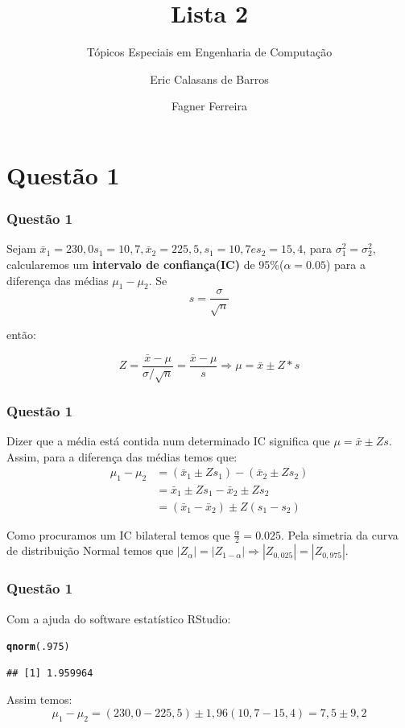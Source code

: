 \documentclass{beamer}\usepackage[]{graphicx}\usepackage[]{color}
\makeatletter
\newcommand{\hlnum}[1]{\textcolor[rgb]{0.686,0.059,0.569}{#1}}%
\newcommand{\hlstd}[1]{\textcolor[rgb]{0.345,0.345,0.345}{#1}}%
\newcommand{\hlkwd}[1]{\textcolor[rgb]{0.737,0.353,0.396}{\textbf{#1}}}%
\newenvironment{kframe}{%
 \def\at@end@of@kframe{}%
 \ifinner\ifhmode%
  \def\at@end@of@kframe{\end{minipage}}%
  \begin{minipage}{\columnwidth}%
 \fi\fi%
 \def\FrameCommand##1{\hskip\@totalleftmargin \hskip-\fboxsep
 \colorbox{shadecolor}{##1}\hskip-\fboxsep
     \hskip-\linewidth \hskip-\@totalleftmargin \hskip\columnwidth}%
 \MakeFramed {\advance\hsize-\width
   \@totalleftmargin\z@ \linewidth\hsize
   \@setminipage}}%
 {\par\unskip\endMakeFramed%
 \at@end@of@kframe}
\newenvironment{knitrout}{}{} %
\makeatother
\begin{document}
	\title{Lista 2}
	\subtitle{Tópicos Especiais em Engenharia de Computação}
	\author{Eric Calasans de Barros \and  Fagner Ferreira}
	
	\begin{frame}[plain]
		\maketitle
	\end{frame}
	
	\section{Questão 1}
		\begin{frame}
			\frametitle{Questão 1}
			Sejam $\bar{x}_{1} = 230,0 s_{1} = 10,7, \bar{x}_{2} = 225,5, s_{1} = 10,7 e s_{2} = 15,4$, para $\sigma_{1}^{2} = \sigma_{2}^{2}$, calcularemos um \textbf{intervalo de confiança(IC)} de 95\%($\alpha = 0.05$) para a diferença das médias $\mu_{1} - \mu_{2}$.  Se $$s = \frac{\sigma}{\sqrt{n}}$$
			
			então:
			
			$$Z = \frac{\bar{x} - \mu}{\sigma/\sqrt{n}} = \frac{\bar{x} - \mu}{s} \Rightarrow \mu = \bar{x} \pm Z*s$$
		\end{frame}
		\begin{frame}
			\frametitle{Questão 1}
			Dizer que a média está contida num determinado IC significa que $\mu = \bar{x} \pm Zs$.  Assim, para a diferença das médias temos que:
				\begin{align*}
					\mu_{1} - \mu_{2} &= (\bar{x}_{1} \pm Zs_{1}) - (\bar{x}_{2} \pm Zs_{2})\\
					&= \bar{x}_{1} \pm  Zs_{1} - \bar{x}_{2} \pm Zs_{2}\\
					&= (\bar{x}_{1} - \bar{x}_{2}) \pm Z(s_{1} - s_{2})
				\end{align*}
				
				Como procuramos um IC bilateral temos que $\frac{\alpha}{2} = 0.025$.  Pela simetria da curva de distribuição Normal temos que $|Z_{\alpha}| = |Z_{1-\alpha}| \Rightarrow |Z_{0,025}| = |Z_{0,975}|$.  
                \end{frame}
                
                \begin{frame}[fragile]
                        \frametitle{Questão 1}
                        Com a ajuda do software estatístico RStudio:
\begin{knitrout}
\color{fgcolor}\begin{kframe}
\begin{alltt}
\hlkwd{qnorm}\hlstd{(}\hlnum{.975}\hlstd{)}
\end{alltt}
\begin{verbatim}
## [1] 1.959964
\end{verbatim}
\end{kframe}
\end{knitrout}
                        Assim temos:
                        $$\mu_{1} - \mu_{2} = (230,0 - 225,5)\pm1,96(10,7-15,4) = 7,5\pm9,2$$

                \end{frame}
                
\end{document}
